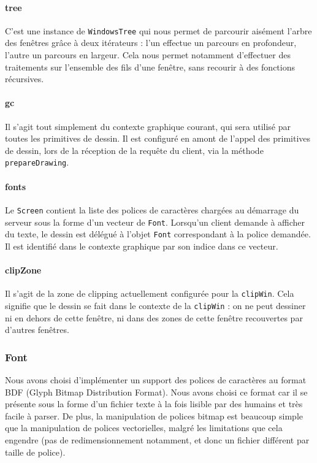 \paragraph{tree}
C'est une instance de \verb|WindowsTree| qui nous permet de parcourir aisément l'arbre des fenêtres grâce à deux itérateurs : l'un effectue un parcours en profondeur, l'autre un parcours en largeur. Cela nous permet notamment d'effectuer des traitements sur l'ensemble des fils d'une fenêtre, sans recourir à des fonctions récursives.

\paragraph{gc}
Il s'agit tout simplement du contexte graphique courant, qui sera utilisé par toutes les primitives de dessin. Il est configuré en amont de l'appel des primitives de dessin, lors de la réception de la requête du client, via la méthode \verb|prepareDrawing|.

\paragraph{fonts}
Le \verb|Screen| contient la liste des polices de caractères chargées au démarrage du serveur sous la forme d'un vecteur de \verb|Font|. Lorsqu'un client demande à afficher du texte, le dessin est délégué à l'objet \verb|Font| correspondant à la police demandée. Il est identifié dans le contexte graphique par son indice dans ce vecteur.

\paragraph{clipZone}
Il s'agit de la zone de clipping actuellement configurée pour la \verb|clipWin|. Cela signifie que le dessin se fait dans le contexte de la \verb|clipWin| : on ne peut dessiner ni en dehors de cette fenêtre, ni dans des zones de cette fenêtre recouvertes par d'autres fenêtres.

\subsubsection{Font}
\label{Font}
Nous avons choisi d'implémenter un support des polices de caractères au format BDF (Glyph Bitmap Distribution Format). Nous avons choisi ce format car il se présente sous la forme d'un fichier texte à la fois lisible par des humains et très facile à parser. De plus, la manipulation de polices bitmap est beaucoup simple que la manipulation de polices vectorielles, malgré les limitations que cela engendre (pas de redimensionnement notamment, et donc un fichier différent par taille de police).

